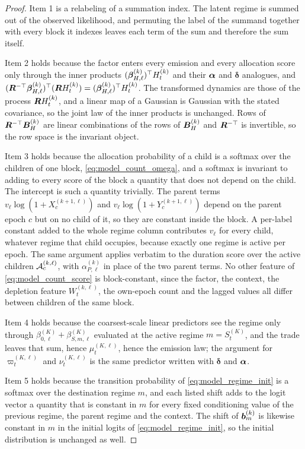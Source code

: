 \begin{proof}
Item 1 is a relabeling of a summation index. The latent regime is summed out of
the observed likelihood, and permuting the label of the summand together with
every block it indexes leaves each term of the sum and therefore the sum
itself.

Item 2 holds because the factor enters every emission and every allocation
score only through the inner products $({\boldsymbol{\beta}}_{H,\ell}^{(k)})^\top H_t^{(k)}$
and their ${\boldsymbol{\alpha}}$ and $\boldsymbol{\delta}$ analogues, and
$({\bm{R}}^{-\top}{\boldsymbol{\beta}}_{H,\ell}^{(k)})^\top ({\bm{R}} H_t^{(k)})
= ({\boldsymbol{\beta}}_{H,\ell}^{(k)})^\top H_t^{(k)}$. The transformed dynamics are those
of the process ${\bm{R}} H_t^{(k)}$, and a linear map of a Gaussian is Gaussian with
the stated covariance, so the joint law of the inner products is unchanged.
Rows of ${\bm{R}}^{-\top}{\bm{B}}_H^{(k)}$ are linear combinations of the rows of
${\bm{B}}_H^{(k)}$ and ${\bm{R}}^{-\top}$ is invertible, so the row space is the
invariant object.

Item 3 holds because the allocation probability of a child is a softmax over
the children of one block, \cref{eq:model_count_omega}, and a softmax is
invariant to adding to every score of the block a quantity that does not depend
on the child. The intercept is such a quantity trivially. The parent terms
$v_\ell \log(1 + X_c^{(k+1,\ell)})$ and $v_\ell \log(1 + Y_c^{(k+1,\ell)})$
depend on the parent epoch $c$ but on no child of it, so they are constant
inside the block. A per-label constant added to the whole regime column
contributes $v_\ell$ for every child, whatever regime that child occupies,
because exactly one regime is active per epoch. The same argument applies
verbatim to the duration score over the active children ${\mathcal{A}}_c^{(k,\ell)}$,
with $\alpha_{P,\ell}^{(k)}$ in place of the two parent terms. No other feature
of \cref{eq:model_count_score} is block-constant, since the
factor, the context, the depletion feature $W_t^{(k,\ell)}$, the own-epoch
count and the lagged values all differ between children of the same block.

Item 4 holds because the coarsest-scale linear predictors see the regime only
through $\beta_{0,\ell}^{(K)} + \beta_{S,m,\ell}^{(K)}$ evaluated at the active
regime $m = S_t^{(K)}$, and the trade leaves that sum, hence
$\mu_t^{(K,\ell)}$, hence the emission law; the argument for
$\varpi_t^{(K,\ell)}$ and $\nu_t^{(K,\ell)}$ is the same predictor written with
$\boldsymbol{\delta}$ and ${\boldsymbol{\alpha}}$.

Item 5 holds because the transition probability of
\cref{eq:model_regime_init} is a softmax over the
destination regime $m$, and each listed shift adds to the logit vector a
quantity that is constant in $m$ for every fixed conditioning value of the
previous regime, the parent regime and the context. The shift of
${\bm{b}}_m^{(k)}$ is likewise constant in $m$ in the initial logits of
\cref{eq:model_regime_init}, so the initial distribution is unchanged as well.
\end{proof}

